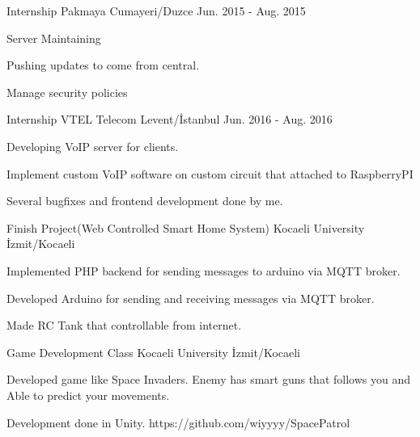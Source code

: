 \begin{cventries}
  \cventry
    {Internship} %
    {Pakmaya} %
    {Cumayeri/Duzce} %
    {Jun. 2015 - Aug. 2015} %
    {
      \begin{cvitems} %
        \item {Server Maintaining}
        \item {Pushing updates to come from central. }
        \item {Manage security policies}
      \end{cvitems}
    }

  \cventry
    {Internship} %
    {VTEL Telecom} %
    {Levent/İstanbul} %
    {Jun. 2016 - Aug. 2016} %
    {
      \begin{cvitems} %
        \item {Developing VoIP server for clients.}
        \item {Implement custom VoIP software on custom circuit that attached to RaspberryPI}
        \item {Several bugfixes and frontend development done by me.}
      \end{cvitems}
    }


  \cventry
    {Finish Project(Web Controlled Smart Home System)} %
    {Kocaeli University} %
    {İzmit/Kocaeli} %
    {} %
    {
      \begin{cvitems} %
        \item {Implemented PHP backend for sending messages to arduino via MQTT broker.}
        \item {Developed Arduino for sending and receiving messages via MQTT broker.}
        \item {Made RC Tank that controllable from internet.}
      \end{cvitems}
    }

  \cventry
    {Game Development Class} %
    {Kocaeli University} %
    {İzmit/Kocaeli} %
    {} %
    {
      \begin{cvitems} %
        \item {Developed game like Space Invaders. Enemy has smart guns that follows you and Able to predict your movements.}
        \item {Development done in Unity. https://github.com/wiyyyy/SpacePatrol }
      \end{cvitems}
    }


\end{cventries}
